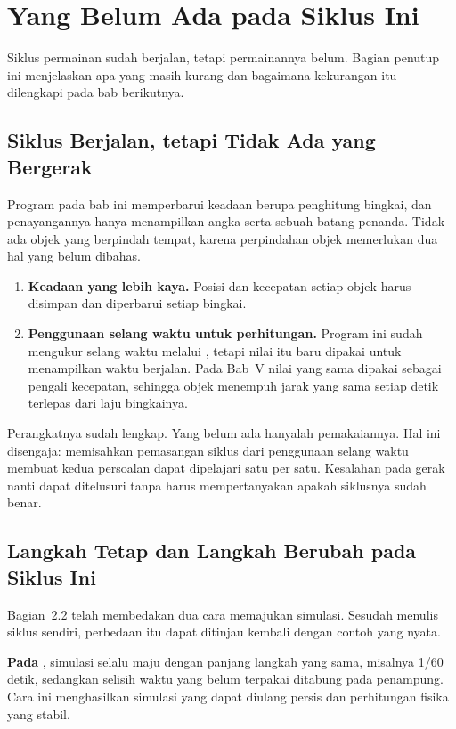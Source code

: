 \section{Yang Belum Ada pada Siklus Ini}
\label{sec:belum-ada}

Siklus permainan sudah berjalan, tetapi permainannya belum. Bagian penutup
ini menjelaskan apa yang masih kurang dan bagaimana kekurangan itu dilengkapi
pada bab berikutnya.

\subsection{Siklus Berjalan, tetapi Tidak Ada yang Bergerak}

Program pada bab ini memperbarui keadaan berupa penghitung bingkai, dan
penayangannya hanya menampilkan angka serta sebuah batang penanda. Tidak ada
objek yang berpindah tempat, karena perpindahan objek memerlukan dua hal yang
belum dibahas.

\begin{enumerate}
  \item \textbf{Keadaan yang lebih kaya.} Posisi dan kecepatan setiap objek
        harus disimpan dan diperbarui setiap bingkai.
  \item \textbf{Penggunaan selang waktu untuk perhitungan.} Program ini
        sudah mengukur selang waktu melalui , tetapi nilai
        itu baru dipakai untuk menampilkan waktu berjalan. Pada Bab~V nilai
        yang sama dipakai sebagai pengali kecepatan, sehingga objek menempuh
        jarak yang sama setiap detik terlepas dari laju bingkainya.
\end{enumerate}

Perangkatnya sudah lengkap. Yang belum ada hanyalah
pemakaiannya. Hal ini disengaja: memisahkan pemasangan siklus dari
penggunaan selang waktu membuat kedua persoalan dapat dipelajari satu per
satu. Kesalahan pada gerak nanti dapat ditelusuri tanpa harus mempertanyakan
apakah siklusnya sudah benar.

\subsection{Langkah Tetap dan Langkah Berubah pada Siklus Ini}

Bagian~2.2 telah membedakan dua cara memajukan simulasi. Sesudah menulis
siklus sendiri, perbedaan itu dapat ditinjau kembali dengan contoh yang nyata.

\textbf{Pada }, simulasi selalu maju dengan panjang
langkah yang sama, misalnya 1/60 detik, sedangkan selisih waktu yang belum
terpakai ditabung pada penampung. Cara ini menghasilkan simulasi yang dapat
diulang persis dan perhitungan fisika yang stabil.

